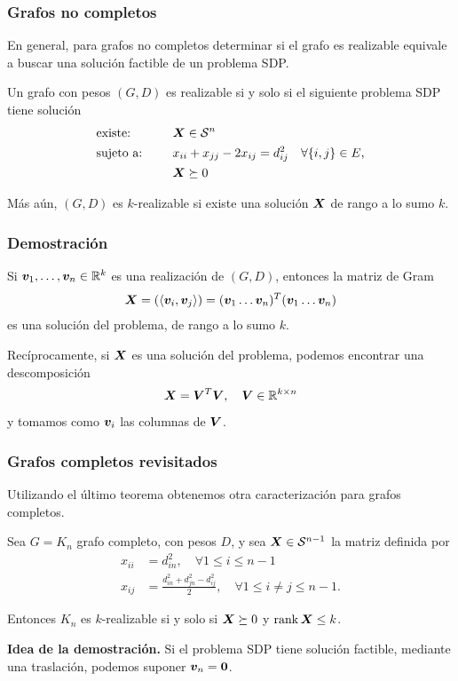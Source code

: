 \documentclass[aspectratio=169,12pt,spanish]{beamer}
\begin{document}

\begin{frame}
\frametitle{Grafos no completos}

En general, para grafos no completos determinar si el grafo es realizable equivale a buscar una solución factible de un problema SDP.

\begin{theorem}
Un grafo con pesos $(G, D)$ es realizable si y solo si el siguiente problema SDP tiene solución
\begin{alignat*}{2}
  & \text{existe: } & & \bm{X} \in {\mathcal S}^n \\
   & \text{sujeto a: } & \quad & x_{ii} + x_{jj} - 2 x_{ij} = d_{ij}^2 \quad \forall \{i, j\} \in E, \\
   &&& \bm{X}  \succeq 0
\end{alignat*}

Más aún, $(G, D)$ es $k$-realizable si existe una solución $\bm{X}$ de rango a lo sumo $k$.
\end{theorem}

\end{frame}


\begin{frame}
\frametitle{Demostración}

Si $\bm{v}_1, \dots, \bm{v}_n \in \mathbb{R}^k$ es una realización de $(G, D)$, entonces la matriz de Gram
$$
\Xb = (\innerl{\vb_i}{\vb_j}) = (\vb_1 \dots \vb_n)^T (\vb_1 \dots \vb_n)
$$
es una solución del problema, de rango a lo sumo $k$.

Recíprocamente, si $\bm{X}$ es una solución del problema, podemos encontrar una descomposición
$$
\bm{X} = \bm{V}^T \bm{V}, \quad \bm{V} \in \mathbb{R}^{k \times n}
$$
y tomamos como $\bm{v}_i$ las columnas de $\bm{V}$.

\end{frame}


\begin{frame}
\frametitle{Grafos completos revisitados}

Utilizando el último teorema obtenemos otra caracterización para grafos completos.

\begin{theorem}
Sea $G = K_n$ grafo completo, con pesos $D$, y sea $\bm{X} \in {\mathcal S}^{n-1}$ la matriz definida por
\begin{align*}
x_{ii} &= d_{in}^2, \quad \forall 1 \le i \le n-1 \\
x_{ij} &= \frac{d_{in}^2 + d_{jn}^2 - d_{ij}^2}{2}, \quad \forall 1 \le i \neq j \le n-1.
\end{align*}

Entonces $K_n$ es $k$-realizable si y solo si $\bm{X} \succeq 0$ y $\operatorname{rank} \bm{X} \le k$.
\end{theorem}

\textbf{Idea de la demostración.} Si el problema SDP tiene solución factible, mediante una traslación, podemos suponer $\bm{v}_n = \bm{0}$.
\end{frame}
\end{document}
